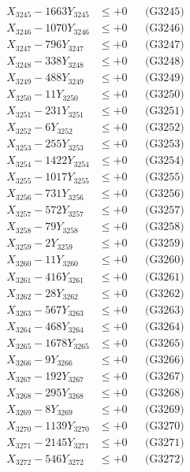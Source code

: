 \documentclass[a4paper,10pt]{article}
\begin{document}
{\begin{align}
X_{3245} - 1663Y_{3245} &\leq +0 && \text{(G3245)} \\
X_{3246} - 1070Y_{3246} &\leq +0 && \text{(G3246)} \\
X_{3247} - 796Y_{3247} &\leq +0 && \text{(G3247)} \\
X_{3248} - 338Y_{3248} &\leq +0 && \text{(G3248)} \\
X_{3249} - 488Y_{3249} &\leq +0 && \text{(G3249)} \\
X_{3250} - 11Y_{3250} &\leq +0 && \text{(G3250)} \\
\allowbreak
X_{3251} - 231Y_{3251} &\leq +0 && \text{(G3251)} \\
X_{3252} - 6Y_{3252} &\leq +0 && \text{(G3252)} \\
X_{3253} - 255Y_{3253} &\leq +0 && \text{(G3253)} \\
X_{3254} - 1422Y_{3254} &\leq +0 && \text{(G3254)} \\
X_{3255} - 1017Y_{3255} &\leq +0 && \text{(G3255)} \\
X_{3256} - 731Y_{3256} &\leq +0 && \text{(G3256)} \\
X_{3257} - 572Y_{3257} &\leq +0 && \text{(G3257)} \\
X_{3258} - 79Y_{3258} &\leq +0 && \text{(G3258)} \\
X_{3259} - 2Y_{3259} &\leq +0 && \text{(G3259)} \\
X_{3260} - 11Y_{3260} &\leq +0 && \text{(G3260)} \\
\allowbreak
X_{3261} - 416Y_{3261} &\leq +0 && \text{(G3261)} \\
X_{3262} - 28Y_{3262} &\leq +0 && \text{(G3262)} \\
X_{3263} - 567Y_{3263} &\leq +0 && \text{(G3263)} \\
X_{3264} - 468Y_{3264} &\leq +0 && \text{(G3264)} \\
X_{3265} - 1678Y_{3265} &\leq +0 && \text{(G3265)} \\
X_{3266} - 9Y_{3266} &\leq +0 && \text{(G3266)} \\
X_{3267} - 192Y_{3267} &\leq +0 && \text{(G3267)} \\
X_{3268} - 295Y_{3268} &\leq +0 && \text{(G3268)} \\
X_{3269} - 8Y_{3269} &\leq +0 && \text{(G3269)} \\
X_{3270} - 1139Y_{3270} &\leq +0 && \text{(G3270)} \\
\allowbreak
X_{3271} - 2145Y_{3271} &\leq +0 && \text{(G3271)} \\
X_{3272} - 546Y_{3272} &\leq +0 && \text{(G3272)} \\

\end{align}}
\end{document}
